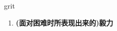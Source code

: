 
\begin{frame}
{\huge grit}
\begin{center}
\begin{enumerate}\Large
  \item \textbf{(面对困难时所表现出来的)毅力}
\end{enumerate}
\end{center}
\end{frame}
